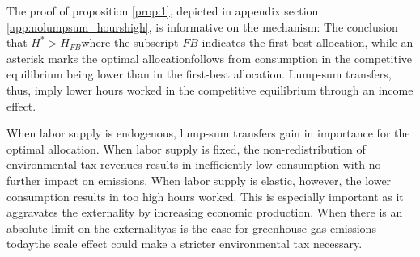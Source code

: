
 
The proof of proposition \ref{prop:1}, depicted in appendix section \ref{app:nolumpsum_hourshigh}, is informative on the mechanism: The conclusion that $H^*>H_{FB}$\textemdash where the subscript $FB$ indicates the first-best allocation, while an asterisk marks the optimal allocation\textemdash follows from consumption in the competitive equilibrium being lower than in the first-best allocation. Lump-sum transfers, thus, imply lower hours worked in the competitive equilibrium through an income effect.



When labor supply is endogenous, lump-sum transfers gain in importance for the optimal allocation. When labor supply is fixed, the non-redistribution of environmental tax revenues results in inefficiently low consumption with no further impact on emissions. When labor supply is elastic, however, the lower consumption results in too high hours worked. This is especially important as it aggravates the externality by increasing economic production. When there is an absolute limit on the externality\textemdash as is the case for greenhouse gas emissions today\textemdash the scale effect could make a stricter environmental tax necessary. 

